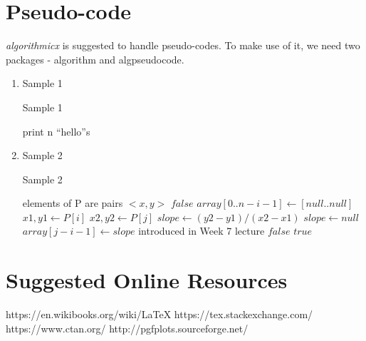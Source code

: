 \documentclass[a4paper,10pt]{article}
\begin{document}
\section{Pseudo-code}
\textit{algorithmicx} is suggested to handle pseudo-codes. To make use of it, we need two packages - \textsf{algorithm} and \textsf{algpseudocode}.
\begin{enumerate}
  \item Sample 1
  \newline\begin{algorithm}
    \caption{Sample 1}
    \begin{algorithmic}
	 \Comment print n ``hello''s
	  \State {}
	\EndFor
      \EndFunction
    \end{algorithmic}
  \end{algorithm}
  
  \item Sample 2
  \begin{algorithm}
    \caption{Sample 2}
    \begin{algorithmic}[2]
      \Comment elements of P are pairs $<x, y>$
          \State \Return $false$
        \EndIf
          \State $array[0..n-i-1] \gets [null..null]$
            \State $x1, y1 \gets P[i]$
            \State $x2, y2 \gets P[j]$
              \State $slope \gets (y2-y1)/(x2-x1)$
            \Else
              \State $slope \gets null$
            \EndIf
            \State $array[j-i-1] \gets slope$
          \EndFor
          \State {}
          \Comment introduced in Week 7 lecture
              \State \Return $false$
            \EndIf
          \EndFor
        \EndFor
        \State \Return $true$
      \EndFunction
    \end{algorithmic}
  \end{algorithm}
\end{enumerate}

\section{Suggested Online Resources}
https://en.wikibooks.org/wiki/LaTeX
\newline https://tex.stackexchange.com/
\newline https://www.ctan.org/
\newline http://pgfplots.sourceforge.net/

\newpage
\printbibliography
\end{document}

